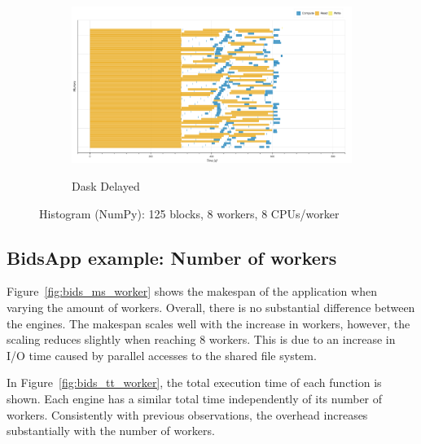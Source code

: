 \documentclass[conference]{IEEEtran}
\begin{document}
\begin{figure}[!tb]
\begin{subfigure}[b]{\columnwidth}
{        \includegraphics[clip,width=\columnwidth,
        height=0.15\textheight]{images/delayed_histo_np_gantt.png}}
        \caption{Dask Delayed}\label{fig:histo_np_dask_delayed_gantt}
    \end{subfigure}
    \caption{Histogram (NumPy): 125 blocks, 8 workers, 8
    CPUs/worker}\label{fig:histo_np_gantt}
\end{figure}

\subsection{BidsApp example: Number of workers}
Figure~\ref{fig:bids_ms_worker} shows the makespan of the application when
varying the amount of workers. Overall, there is no substantial difference
between the engines. The makespan scales well with the increase in workers,
however, the scaling reduces slightly when reaching 8 workers. This is due
to an increase in I/O time caused by parallel accesses to 
the shared file system.

In Figure~\ref{fig:bids_tt_worker}, the total execution time of each function is
shown. Each engine has a similar total time independently of its number of workers.
Consistently with previous observations, the overhead increases substantially with the 
number of workers.




\end{document}
